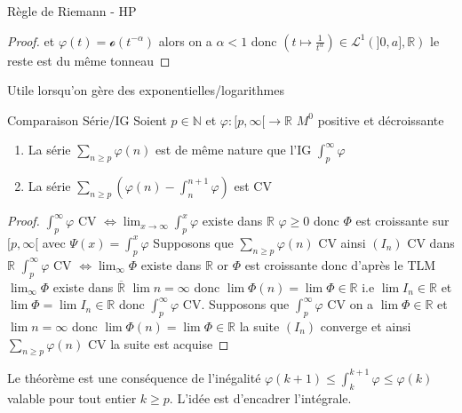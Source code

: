 \documentclass[11pt,hidelinks]{book}
\theoremstyle{mytheoremstyle}
\theoremstyle{mytheoremstyle}
\theoremstyle{mytheoremstyle}
\theoremstyle{mytheoremstyle}
\theoremstyle{mytheoremstyle}
\theoremstyle{mytheoremstyle}
\theoremstyle{mytheoremstyle}
\theoremstyle{mytheoremstyle}
\theoremstyle{myproblemstyle}
\def\mbb#1{\mathbb{#1}}
\def\mfc#1{\mathcal{#1}}
\def\bN{\mbb{N}}
\def\bR{\mbb{R}}
\newcommand{\func}[3]{#1\colon#2\to#3}
\newcommand{\parenth}[1]{\left(#1\right)}
\begin{document}
\begin{adjustwidth}{-2em}{-1em}
\begin{theorem}{Règle de Riemann - HP}
\begin{proof}
            et $\varphi(t) = \mfc{o}(t^{-\alpha})$ alors on a $\alpha < 1$ donc $\parenth{t \mapsto \frac{1}{t^{\alpha}}} \in \mfc{L}^1(]0,a], \bR)$
            le reste est du même tonneau
        \end{proof}
        Utile lorsqu'on gère des exponentielles/logarithmes
    \end{theorem}
    \begin{theorem}{Comparaison Série/IG}
        Soient $p \in \bN$ et $\func{\varphi}{[p,\infty[}{\bR}$ $M^0$ positive et décroissante
        \begin{enumerate}
            \item La série $\sum_{n \geq p} \varphi(n)$ est de même nature que l'IG $\int_{p}^{\infty} \varphi$
            \item La série $\sum_{n \geq p} \parenth{\varphi(n) - \int_{n}^{n+1} \varphi}$ est CV
        \end{enumerate}
        \begin{proof}
                    $\int_{p}^{\infty} \varphi$ CV $\Leftrightarrow \lim_{x \to \infty} \int_{p}^{x} \varphi$ existe dans $\bR$ $\varphi \geq 0$ donc $\Phi$ est croissante sur $[p, \infty[$ avec $\Psi(x) = \int_{p}^{x} \varphi$ 
                    Supposons que $\sum_{n \geq p} \varphi(n)$ CV ainsi $(I_n)$ CV dans $\bR$ $\int_{p}^{\infty} \varphi$ CV $\Leftrightarrow \lim_{\infty} \Phi$ existe dans $\bR$
                    or $\Phi$ est croissante donc d'après le TLM $\lim_{\infty} \Phi$ existe dans $\overline{\bR}$ $\lim n = \infty$ donc $\lim \Phi(n) = \lim \Phi \in \bR$ i.e $\lim I_n \in \bR$ et $\lim \Phi = \lim I_n \in \bR$ donc $\int_{p}^{\infty} \varphi$ CV.
                    Supposons que $\int_{p}^{\infty} \varphi$ CV on a $\lim \Phi \in \bR$ et $\lim n = \infty$ donc $\lim \Phi(n) = \lim \Phi \in \bR$ 
                    la suite $(I_n)$ converge et ainsi $\sum_{n \geq p} \varphi(n)$ CV
            la suite est acquise
        

        \end{proof}
    \end{theorem}
    \begin{rmq}
        Le théorème est une conséquence de l'inégalité $\varphi(k+1) \leq \int_{k}^{k+1} \varphi \leq \varphi(k)$ valable
        pour tout entier $k \geq p$. L'idée est d'encadrer l'intégrale. 
    \end{rmq}
\end{adjustwidth}
\end{document}
